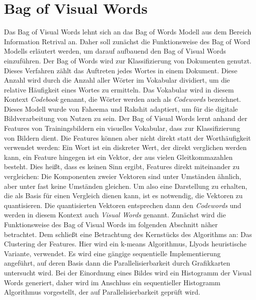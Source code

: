 \section{Bag of Visual Words}

Das Bag of Visual Words lehnt sich an das Bag of Words Modell aus dem Bereich Information Retrival an. Daher soll zunächst die Funktionsweise des Bag of Word Modells erläutert werden, um darauf aufbauend den Bag of Visual Words einzuführen.\newline 
Der Bag of Words wird zur Klassifizierung von Dokumenten genutzt. Dieses Verfahren zählt das Auftreten jedes Wortes in einem Dokument. Diese Anzahl wird durch die Anzahl aller Wörter im Vokabular dividiert, um die relative Häufigkeit eines Wortes zu ermitteln. Das Vokabular wird in diesem Kontext \textit{Codebook} genannt, die Wörter werden auch als \textit{Codewords} bezeichnet.\newline
Dieses Modell wurde von Faheema und Rakshit \cite{bow2010} adaptiert, um für die digitale Bildverarbeitung von Nutzen zu sein. Der Bag of Visual Words lernt anhand der Features von Trainingsbildern ein visuelles Vokabular, dass zur Klassifizierung von Bildern dient. Die Features können aber nicht direkt statt der Worthäufigkeit verwendet werden: Ein Wort ist ein diskreter Wert, der direkt verglichen werden kann, ein Feature hingegen ist ein Vektor, der aus vielen Gleitkommazahlen besteht. Dies heißt, dass es keinen Sinn ergibt, Features direkt miteinander zu vergleichen: Die Komponenten zweier Vektoren sind unter Umständen ähnlich, aber unter fast keine Umständen gleichen. Um also eine Darstellung zu erhalten, die als Basis für einen Vergleich dienen kann, ist es notwendig, die Vektoren zu quantisieren. Die quantisierten Vektoren entsprechen dann den \textit{Codewords} und werden in diesem Kontext auch \textit{Visual Words} genannt. \newline
Zunächst wird die Funktionsweise des Bag of Visual Words im folgenden Abschnitt näher betrachtet. Dem schließt eine Betrachtung des Kernstücks des Algorithms an: Das Clustering der Features. Hier wird ein k-means Algorithmus, Llyods heuristische Variante, verwendet. Es wird eine gängige sequentielle Implementierung angeführt, auf deren Basis dann die Parallelisierbarkeit durch Grafikkarten untersucht wird.\newline
Bei der Einordnung eines Bildes wird ein Histogramm der Visual Words generiert, daher wird im Anschluss ein sequentieller Histogramm Algorithmus vorgestellt, der auf Parallelisierbarkeit geprüft wird.



